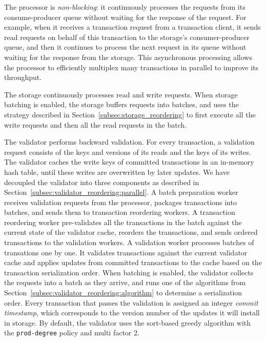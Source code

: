 The processor is \emph{non-blocking}: it continuously processes the requests from its consume-producer queue without waiting for the response of the request. For example, when it receives a transaction request from a transaction client, it sends read requests on behalf of this transaction to the storage's consumer-producer queue, and then it continues to process the next request in its queue without waiting for the response from the storage. This asynchronous processing allows the processor to efficiently multiplex many transactions in parallel to improve its throughput.


The storage continuously processes read and write requests. When storage batching is enabled, the storage buffers requests into batches, and uses the strategy described in Section~\ref{subsec:storage_reordering} to first execute all the write requests and then all the read requests in the batch.

The validator performs backward validation. For every transaction, a validation request consists of the keys and versions of its reads and the keys of its writes. The validator caches the write keys of committed transactions in an in-memory hash table, until these writes are overwritten by later updates.
We have decoupled the validator into three components as described in Section~\ref{subsec:validator_reordering:parallel}. A batch preparation worker receives validation requests from the processor, packages transactions into batches, and sends them to transaction reordering workers. A transaction reordering worker pre-validates all the transactions in the batch against the current state of the validator cache, reorders the transactions, and sends ordered transactions to the validation workers. A validation worker processes batches of transations one by one. It validates transactions against the current validator cache and applies updates from committed transactions to the cache based on the transaction serialization order.  When batching is enabled, the validator collects the requests into a batch as they arrive, and runs one of the algorithms from Section~\ref{subsec:validator_reordering:algorithm} to determine a serialization order. Every transaction that passes the validation is assigned an integer \emph{commit timestamp}, which corresponds to the version number of the updates it will install in storage. 
By default, the validator uses the sort-based greedy algorithm with the \texttt{prod-degree} policy and multi factor 2.


